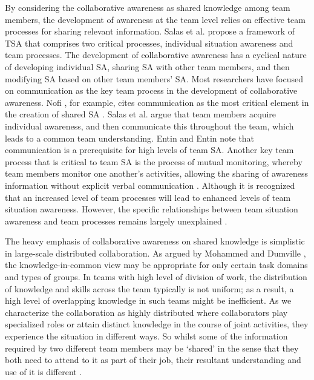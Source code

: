 By considering the collaborative awareness as shared knowledge among team members, the development of awareness at the team level relies on effective team processes for sharing relevant information. Salas et al. \cite{salas1995situation} propose a framework of TSA that comprises two critical processes, individual situation awareness and team processes. The development of collaborative awareness has a cyclical nature of developing individual SA, sharing SA with other team members, and then modifying SA based on other team members' SA. Most researchers have focused on communication as the key team process in the development of collaborative awareness. Nofi \cite{nofi2000defining}, for example, cites communication as the most critical element in the creation of shared SA . Salas et al. \cite{salas1995situation} argue that team members acquire individual awareness, and then communicate this throughout the team, which leads to a common team understanding. Entin and Entin \cite{entin2000assessing} note that communication is a prerequisite for high levels of team SA. Another key team process that is critical to team SA is the process of mutual monitoring, whereby team members monitor one another's activities, allowing the sharing of awareness information without explicit verbal communication \cite{Gutwin2002,Salmon2008}. Although it is recognized that an increased level of team processes will lead to enhanced levels of team situation awareness. However, the specific relationships between team situation awareness and team processes remains largely unexplained \cite{Salmon2008}.

The heavy emphasis of collaborative awareness on shared knowledge is simplistic in large-scale distributed collaboration. As argued by Mohammed and Dumville \cite{Mohammed2001}, the knowledge-in-common view may be appropriate for only certain task domains and types of groups. In teams with high level of division of work, the distribution of knowledge and skills across the team typically is not uniform; as a result, a high level of overlapping knowledge in such teams might be inefficient. As we characterize the collaboration as highly distributed where collaborators play specialized roles or attain distinct knowledge in the course of joint activities, they experience the situation in different ways. So whilst some of the information required by two different team members may be `shared' in the sense that they both need to attend to it as part of their job, their resultant understanding and use of it is different \cite{Salmon2010}.

